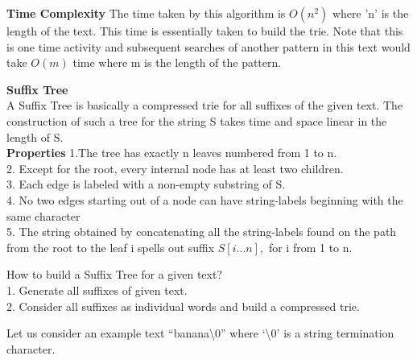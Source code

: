 \documentclass[11pt,a4paper]{article}
\begin{document}
\textbf{Time Complexity}
The time taken by this algorithm is \begin{math}O(n^2)\end{math} where 'n' is the length of the text. This time is essentially taken to build the trie. Note that this is one time activity and subsequent searches of another pattern in this text would take \begin{math} O(m) \end{math} time where m is the length of the pattern. \vspace{0.8 cm}

\textbf{Suffix Tree}
\\
A Suffix Tree is basically a compressed trie for all suffixes of the given text. The construction of such a tree for the string S takes time and space linear in the length of S.
\\

\textbf{Properties}
1.The tree has exactly n leaves numbered from 1 to n.
\\
2. Except for the root, every internal node has at least two children.
\\
3. Each edge is labeled with a non-empty substring of S.
\\
4. No two edges starting out of a node can have string-labels beginning with the same character
\\
5. The string obtained by concatenating all the string-labels found on the path from the root to the leaf i spells out suffix \begin{math} S[i... n],\end{math} for i from 1 to n. \vspace{0.5cm}

How to build a Suffix Tree for a given text? 
\\
1. Generate all suffixes of given text.
\\
2. Consider all suffixes as individual words and build a compressed trie.\vspace{0.4cm}

Let us consider an example text  “banana\textbackslash0” where ‘\textbackslash0’ is a string termination character.

\end{document}
